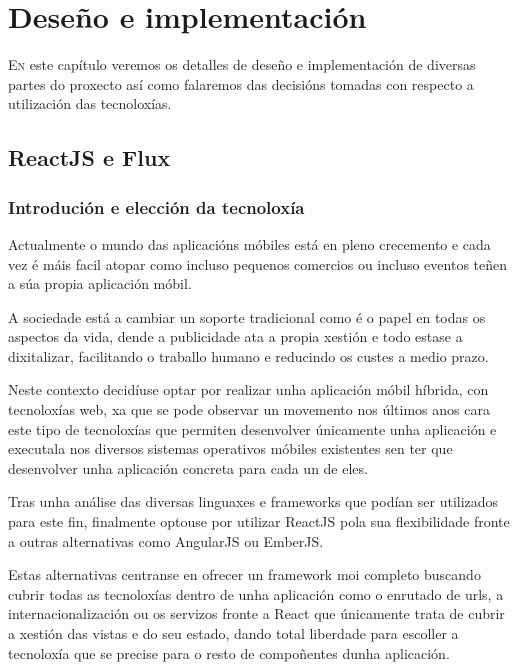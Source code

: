 \chapter{Deseño e implementación}
\minitoc


  \lettrine{E}{n} este capítulo veremos os detalles de deseño e implementación 
de diversas partes do proxecto así como falaremos das decisións tomadas con 
respecto a utilización das tecnoloxías.

  \section{ReactJS e Flux}
    \subsection{Introdución e elección da tecnoloxía}
    Actualmente o mundo das aplicacións móbiles está en pleno crecemento e cada 
vez é máis facil atopar como incluso pequenos comercios ou incluso eventos 
teñen a súa propia aplicación móbil.

    A sociedade está a cambiar un soporte tradicional como é o papel en todas 
os aspectos da vida, dende a publicidade ata a propia xestión e todo estase a 
dixitalizar, facilitando o traballo humano e reducindo os custes a medio prazo.

    Neste contexto decidíuse optar por realizar unha aplicación móbil 
híbrida, con tecnoloxías web, xa que se pode observar un movemento nos últimos 
anos cara este tipo de tecnoloxías que permiten desenvolver únicamente unha 
aplicación e executala nos diversos sistemas operativos móbiles existentes sen 
ter que desenvolver unha aplicación concreta para cada un de eles.

    Tras unha análise das diversas linguaxes e frameworks que podían 
ser utilizados para este fin, finalmente optouse por utilizar ReactJS pola sua 
flexibilidade fronte a outras alternativas como AngularJS ou EmberJS.

    Estas alternativas centranse en ofrecer un framework moi completo buscando 
cubrir todas as tecnoloxías dentro de unha aplicación como o enrutado de urls, 
a internacionalización ou os servizos fronte a React que únicamente trata de 
cubrir a xestión das vistas e do seu estado, dando total liberdade para 
escoller a tecnoloxía que se precise para o resto de compoñentes dunha 
aplicación.

